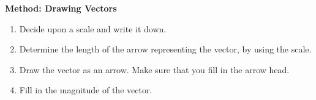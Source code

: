       \par 
      \label{m38812*id187725}
        \textbf{Method: Drawing Vectors}
        \label{m38812*id187736}\begin{enumerate}[noitemsep, label=\textbf{\arabic*}. ] 
            \label{m38812*uid18}\item Decide upon a scale and write it down.
\label{m38812*uid19}\item Determine the length of the arrow representing the vector, by using the scale.
\label{m38812*uid20}\item Draw the vector as an arrow. Make sure that you fill in the arrow head.
\label{m38812*uid21}\item Fill in the magnitude of the vector.
\end{enumerate}
        
      \par 
\par
            \label{m38812*secfhsst!!!underscore!!!id189}\vspace{.5cm} 
      
